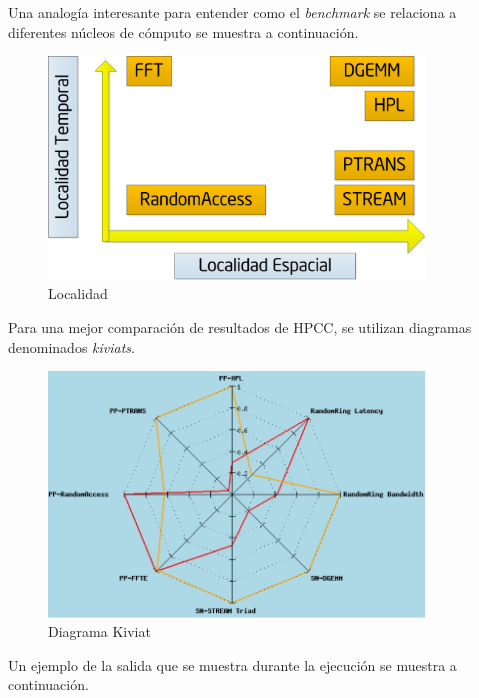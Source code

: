 \documentclass[a4paper]{report}
\begin{document}
\bigskip

Una analog\'ia interesante para entender como el {\it benchmark} se relaciona a diferentes n\'ucleos de c\'omputo
se muestra a continuaci\'on.

\bigskip

\begin{figure}[H]
\begin{center}
\includegraphics[width=10cm]{locality.png}
\caption{Localidad}
\end{center}
\end{figure}

\bigskip

Para una mejor comparaci\'on de resultados de HPCC, se utilizan diagramas denominados {\it kiviats}.

\begin{figure}[H]
\begin{center}
\includegraphics[width=10cm]{kiviat.png}
\caption{Diagrama Kiviat}
\end{center}
\end{figure}

Un ejemplo de la salida que se muestra durante la ejecuci\'on se muestra a continuaci\'on.
\end{document}
